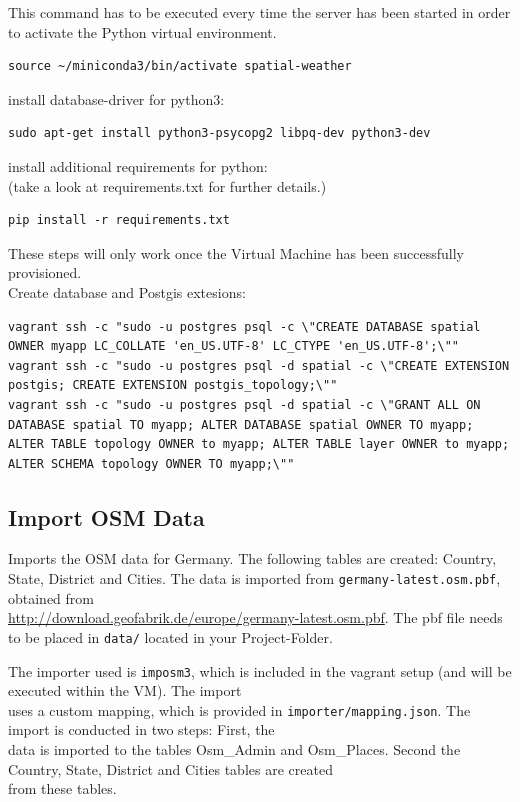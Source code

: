 \documentclass[paper=a4, fontsize=11pt]{scrartcl} %
\numberwithin{equation}{section} %
\numberwithin{figure}{section} %
\numberwithin{table}{section} %
\begin{document}
This command has to be executed every time the server has been started in order to activate the Python virtual environment.
\begin{lstlisting}
source ~/miniconda3/bin/activate spatial-weather
\end{lstlisting}

install database-driver for python3:
\begin{lstlisting}
sudo apt-get install python3-psycopg2 libpq-dev python3-dev
\end{lstlisting}

install additional requirements for python:\\
(take a look at requirements.txt for further details.)
\begin{lstlisting}
pip install -r requirements.txt
\end{lstlisting}

These steps will only work once the Virtual Machine has been successfully provisioned.\\
Create database and Postgis extesions:
\begin{lstlisting}[breaklines=true]
vagrant ssh -c "sudo -u postgres psql -c \"CREATE DATABASE spatial OWNER myapp LC_COLLATE 'en_US.UTF-8' LC_CTYPE 'en_US.UTF-8';\"" 
vagrant ssh -c "sudo -u postgres psql -d spatial -c \"CREATE EXTENSION postgis; CREATE EXTENSION postgis_topology;\"" 
vagrant ssh -c "sudo -u postgres psql -d spatial -c \"GRANT ALL ON DATABASE spatial TO myapp; ALTER DATABASE spatial OWNER TO myapp; ALTER TABLE topology OWNER to myapp; ALTER TABLE layer OWNER to myapp; ALTER SCHEMA topology OWNER TO myapp;\""
\end{lstlisting}

\subsection{Import OSM Data}\label{import-osm-data}

Imports the OSM data for Germany. The following tables are created:
Country, State, District and Cities. The data is imported from
\texttt{germany-latest.osm.pbf}, obtained from\\
\href{http://download.geofabrik.de/europe/germany-latest.osm.pbf}{http://download.geofabrik.de/europe/germany-latest.osm.pbf}.
 The pbf file needs to be
placed in \texttt{data/} located in your Project-Folder.

The importer used is \texttt{imposm3}, which is included in the vagrant
setup (and will be executed within the VM). The import\\uses a custom
mapping, which is provided in \texttt{importer/mapping.json}. The import
is conducted in two steps: First, the\\data is imported to the tables
Osm\_Admin and Osm\_Places. Second the Country, State, District and
Cities tables are created\\from these tables.
\end{document}
